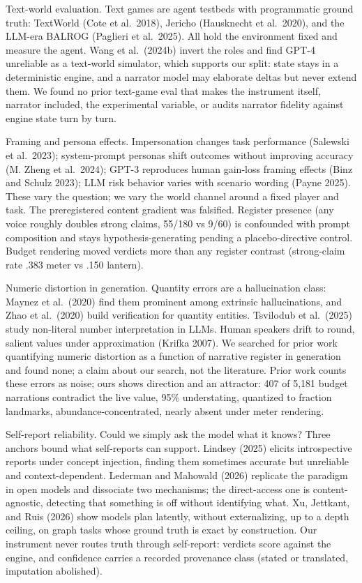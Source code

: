 \documentclass[11pt]{article}
\begin{document}
Text-world evaluation. Text games are agent testbeds with programmatic
ground truth: TextWorld (Cote et al.~2018), Jericho (Hausknecht et
al.~2020), and the LLM-era BALROG (Paglieri et al.~2025). All hold the
environment fixed and measure the agent. Wang et al.~(2024b) invert the
roles and find GPT-4 unreliable as a text-world simulator, which
supports our split: state stays in a deterministic engine, and a
narrator model may elaborate deltas but never extend them. We found no
prior text-game eval that makes the instrument itself, narrator
included, the experimental variable, or audits narrator fidelity against
engine state turn by turn.

Framing and persona effects. Impersonation changes task performance
(Salewski et al.~2023); system-prompt personas shift outcomes without
improving accuracy (M. Zheng et al.~2024); GPT-3 reproduces human
gain-loss framing effects (Binz and Schulz 2023); LLM risk behavior
varies with scenario wording (Payne 2025). These vary the question; we
vary the world channel around a fixed player and task. The preregistered
content gradient was falsified. Register presence (any voice roughly
doubles strong claims, 55/180 vs 9/60) is confounded with prompt
composition and stays hypothesis-generating pending a placebo-directive
control. Budget rendering moved verdicts more than any register contrast
(strong-claim rate .383 meter vs .150 lantern).

Numeric distortion in generation. Quantity errors are a hallucination
class: Maynez et al.~(2020) find them prominent among extrinsic
hallucinations, and Zhao et al.~(2020) build verification for quantity
entities. Tsvilodub et al.~(2025) study non-literal number
interpretation in LLMs. Human speakers drift to round, salient values
under approximation (Krifka 2007). We searched for prior work
quantifying numeric distortion as a function of narrative register in
generation and found none; a claim about our search, not the literature.
Prior work counts these errors as noise; ours shows direction and an
attractor: 407 of 5,181 budget narrations contradict the live value,
95\% understating, quantized to fraction landmarks,
abundance-concentrated, nearly absent under meter rendering.

Self-report reliability. Could we simply ask the model what it knows?
Three anchors bound what self-reports can support. Lindsey (2025)
elicits introspective reports under concept injection, finding them
sometimes accurate but unreliable and context-dependent. Lederman and
Mahowald (2026) replicate the paradigm in open models and dissociate two
mechanisms; the direct-access one is content-agnostic, detecting that
something is off without identifying what. Xu, Jettkant, and Ruis (2026)
show models plan latently, without externalizing, up to a depth ceiling,
on graph tasks whose ground truth is exact by construction. Our
instrument never routes truth through self-report: verdicts score
against the engine, and confidence carries a recorded provenance class
(stated or translated, imputation abolished).
\end{document}
